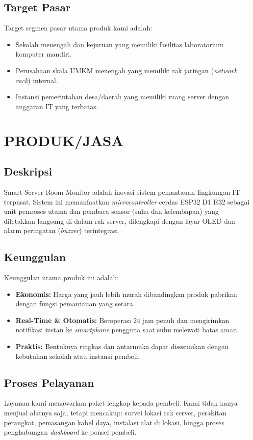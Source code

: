 \documentclass[12pt, a4paper]{article}
\begin{document}
\subsection{Target Pasar}
Target segmen pasar utama produk kami adalah:
\begin{itemize}
    \item Sekolah menengah dan kejuruan yang memiliki fasilitas laboratorium komputer mandiri.
    \item Perusahaan skala UMKM menengah yang memiliki rak jaringan (\textit{network rack}) internal.
    \item Instansi pemerintahan desa/daerah yang memiliki ruang server dengan anggaran IT yang terbatas.
\end{itemize}

\section{PRODUK/JASA}

\subsection{Deskripsi}
Smart Server Room Monitor adalah inovasi sistem pemantauan lingkungan IT terpusat. Sistem ini memanfaatkan \textit{microcontroller} cerdas ESP32 D1 R32 sebagai unit pemroses utama dan pembaca sensor (suhu dan kelembapan) yang diletakkan langsung di dalam rak server, dilengkapi dengan layar OLED dan alarm peringatan (\textit{buzzer}) terintegrasi.

\subsection{Keunggulan}
Keunggulan utama produk ini adalah:
\begin{itemize}
    \item \textbf{Ekonomis:} Harga yang jauh lebih murah dibandingkan produk pabrikan dengan fungsi pemantauan yang setara.
    \item \textbf{Real-Time \& Otomatis:} Beroperasi 24 jam penuh dan mengirimkan notifikasi instan ke \textit{smartphone} pengguna saat suhu melewati batas aman.
    \item \textbf{Praktis:} Bentuknya ringkas dan antarmuka dapat disesuaikan dengan kebutuhan sekolah atau instansi pembeli.
\end{itemize}

\subsection{Proses Pelayanan}
Layanan kami menawarkan paket lengkap kepada pembeli. Kami tidak hanya menjual alatnya saja, tetapi mencakup: survei lokasi rak server, perakitan perangkat, pemasangan kabel daya, instalasi alat di lokasi, hingga proses penghubungan \textit{dashboard} ke ponsel pembeli.
\end{document}

